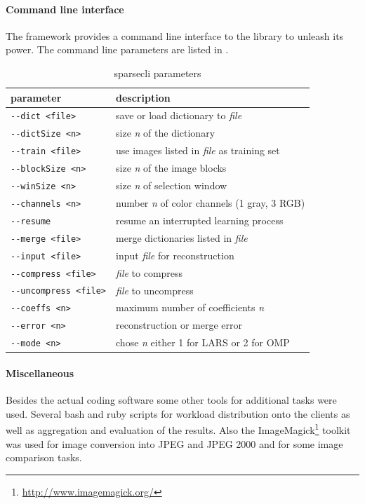 \paragraph{Command line interface}
The framework provides a command line interface to the library to unleash its
power. The command line parameters are listed in .
%
\begin{table}[h]
\centering
\begin{tabular}{ |l | l |}
\hline
parameter & description \\
\hline
\verb+--dict <file>+ & save or load dictionary to \emph{file}\\
\verb+--dictSize <n>+ & size \emph{n} of the dictionary  \\
\verb+--train <file>+ & use images listed in \emph{file} as training set\\
\verb+--blockSize <n>+ & size \emph{n} of the image blocks \\
\verb+--winSize <n>+ & size \emph{n} of selection window \\
\verb+--channels <n>+ &number \emph{n} of color channels (1 gray, 3 RGB) \\

\verb+--resume+ & resume an interrupted learning process \\
\verb+--merge <file>+ & merge dictionaries listed in \emph{file}  \\
\verb+--input <file>+ & input \emph{file} for reconstruction \\
\verb+--compress <file>+ & \emph{file} to compress \\
\verb+--uncompress <file>+ & \emph{file} to uncompress \\
\verb+--coeffs <n>+ & maximum number of coefficients \emph{n} \\
\verb+--error <n>+ & reconstruction or merge error \\
\verb+--mode <n>+ & chose \emph{n} either 1 for LARS or 2 for OMP \\
\hline
\end{tabular}
\caption{sparsecli parameters}\label{tab:cli}
\end{table}

\paragraph{Miscellaneous}
Besides the actual coding software some other tools for
additional tasks were used. Several bash and ruby scripts for workload
distribution onto the clients as well as aggregation and evaluation of the
results. 
Also the ImageMagick\footnote{\url{http://www.imagemagick.org/}} toolkit was
used for image conversion into JPEG and JPEG 2000 and for some image comparison
tasks.



